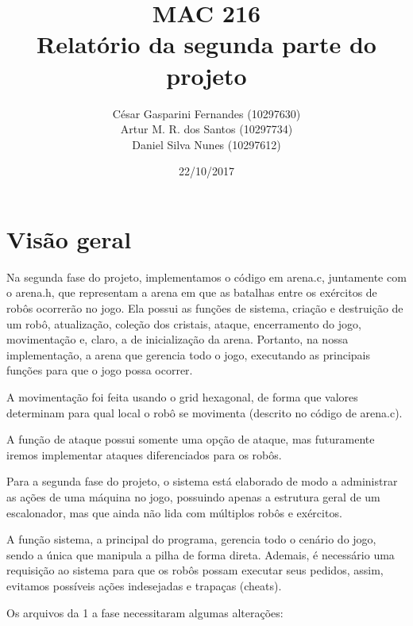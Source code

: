 \documentclass[12pt, a4paper]{article}
\begin{document}
\title {\textbf{MAC 216} \\ Relatório da segunda parte do projeto\\}
\author {César Gasparini Fernandes (10297630) \\ Artur M. R. dos
Santos (10297734)\\ Daniel Silva Nunes (10297612)}
\date {22/10/2017}
\maketitle
\section{Visão geral}
Na segunda fase do projeto, implementamos o código em arena.c, juntamente com o arena.h, que representam a arena em que as batalhas entre os exércitos de robôs ocorrerão no jogo. Ela possui as funções de sistema, criação e destruição de um robô, atualização, coleção dos cristais, ataque, encerramento do jogo, movimentação e, claro, a de inicialização da arena.
Portanto, na nossa implementação, a arena que gerencia todo o
jogo, executando as principais funções para que o jogo possa
ocorrer.\par
A movimentação foi feita usando o grid hexagonal, de forma que
valores determinam para qual local o robô se movimenta (descrito
no código de arena.c).\par
A função de ataque possui somente uma opção de ataque, mas
futuramente iremos implementar ataques diferenciados para os
robôs.\par
Para a segunda fase do projeto, o sistema está elaborado de modo a administrar as ações de uma máquina no jogo, possuindo apenas a estrutura geral de um escalonador, mas que ainda não lida com múltiplos robôs e exércitos. \par
A função sistema, a principal do programa, gerencia todo o cenário
do jogo, sendo a única que manipula a pilha de forma direta.
Ademais, é necessário uma requisição ao sistema para que os robôs
possam executar seus pedidos, assim, evitamos possíveis ações
indesejadas e trapaças (cheats).\par
Os arquivos da 1 a fase necessitaram algumas alterações:\par
\end{document}

